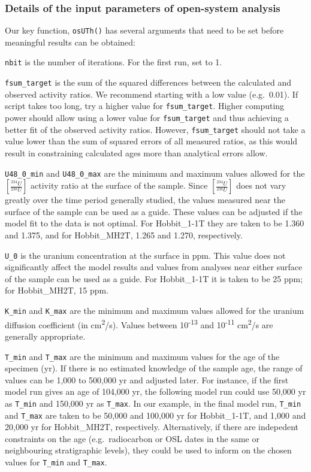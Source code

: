 \documentclass[]{elsarticle} %
\begin{document}
\hypertarget{details-of-the-input-parameters-of-open-system-analysis}{%
\subsubsection{Details of the input parameters of open-system analysis}\label{details-of-the-input-parameters-of-open-system-analysis}}

Our key function, \texttt{osUTh()} has several arguments that need to be set before meaningful results can be obtained:

\texttt{nbit} is the number of iterations. For the first run, set to 1.

\texttt{fsum\_target} is the sum of the squared differences between the calculated and observed activity ratios. We recommend starting with a low value (e.g.~0.01). If script takes too long, try a higher value for \texttt{fsum\_target}. Higher computing power should allow using a lower value for \texttt{fsum\_target} and thus achieving a better fit of the observed activity ratios. However, \texttt{fsum\_target} should not take a value lower than the sum of squared errors of all measured ratios, as this would result in constraining calculated ages more than analytical errors allow.

\texttt{U48\_0\_min} and \texttt{U48\_0\_max} are the minimum and maximum values allowed for the \([\frac{^{234}U}{^{238}U}]\) activity ratio at the surface of the sample. Since \([\frac{^{234}U}{^{238}U}]\) does not vary greatly over the time period generally studied, the values measured near the surface of the sample can be used as a guide. These values can be adjusted if the model fit to the data is not optimal. For Hobbit\_1-1T they are taken to be 1.360 and 1.375, and for Hobbit\_MH2T, 1.265 and 1.270, respectively.

\texttt{U\_0} is the uranium concentration at the surface in ppm. This value does not significantly affect the model results and values from analyses near either surface of the sample can be used as a guide. For Hobbit\_1-1T it is taken to be 25 ppm; for Hobbit\_MH2T, 15 ppm.

\texttt{K\_min} and \texttt{K\_max} are the minimum and maximum values allowed for the uranium diffusion coefficient (in cm\textsuperscript{2}/s). Values between 10\textsuperscript{-13} and 10\textsuperscript{-11} cm\textsuperscript{2}/s are generally appropriate.

\texttt{T\_min} and \texttt{T\_max} are the minimum and maximum values for the age of the specimen (yr). If there is no estimated knowledge of the sample age, the range of values can be 1,000 to 500,000 yr and adjusted later. For instance, if the first model run gives an age of 104,000 yr, the following model run could use 50,000 yr as \texttt{T\_min} and 150,000 yr as \texttt{T\_max}. In our example, in the final model run, \texttt{T\_min} and \texttt{T\_max} are taken to be 50,000 and 100,000 yr for Hobbit\_1-1T, and 1,000 and 20,000 yr for Hobbit\_MH2T, respectively. Alternatively, if there are indepedent constraints on the age (e.g.~radiocarbon or OSL dates in the same or neighbouring stratigraphic levels), they could be used to inform on the chosen values for \texttt{T\_min} and \texttt{T\_max}.
\end{document}
